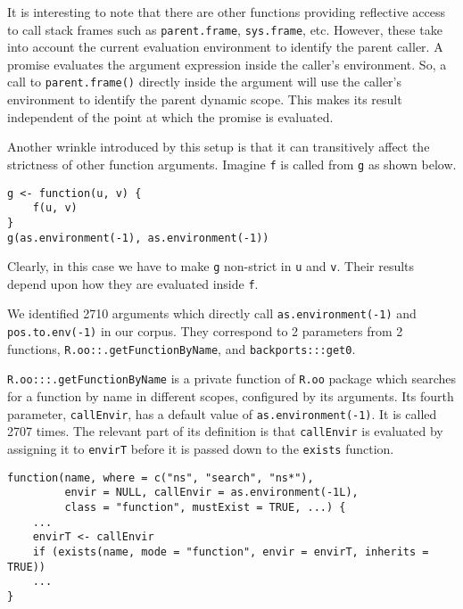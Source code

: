 \documentclass[screen,acmsmall]{acmart}
\newcommand{\code}[1]{\lstinline[style=R]|#1|\xspace}
\begin{document}
It is interesting to note that there are other functions providing reflective
access to call stack frames such as \code{parent.frame}, \code{sys.frame}, etc.
However, these take into account the current evaluation environment to identify
the parent caller. A promise evaluates the argument expression inside the
caller's environment. So, a call to \code{parent.frame()} directly inside the
argument will use the caller's environment to identify the parent dynamic scope.
This makes its result independent of the point at which the promise is
evaluated.

Another wrinkle introduced by this setup is that it can transitively affect the
strictness of other function arguments. Imagine \code{f} is called from \code{g}
as shown below.

\begin{lstlisting}
g <- function(u, v) {
    f(u, v)
}
g(as.environment(-1), as.environment(-1))
\end{lstlisting}

Clearly, in this case we have to make \code{g} non-strict in \code{u} and
\code{v}. Their results depend upon how they are evaluated inside \code{f}.

We identified 2710 arguments which directly call \code{as.environment(-1)} and
\code{pos.to.env(-1)} in our corpus. They correspond to 2 parameters from 2
functions, \code{R.oo::.getFunctionByName}, and \code{backports:::get0}.

\code{R.oo:::.getFunctionByName} is a private function of \code{R.oo} package
which searches for a function by name in different scopes, configured by its
arguments. Its fourth parameter, \code{callEnvir}, has a default value of
\code{as.environment(-1)}. It is called 2707 times. The relevant part of its
definition is that \code{callEnvir} is evaluated by assigning it to
\code{envirT} before it is passed down to the \code{exists} function.

\begin{lstlisting}
function(name, where = c("ns", "search", "ns*"),
         envir = NULL, callEnvir = as.environment(-1L),
         class = "function", mustExist = TRUE, ...) {
    ...
    envirT <- callEnvir
    if (exists(name, mode = "function", envir = envirT, inherits = TRUE))
    ...
}
\end{lstlisting}
\end{document}
